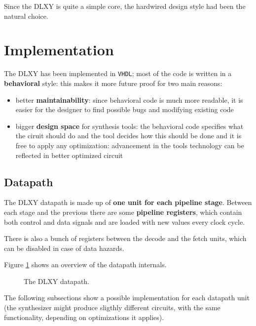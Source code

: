 \bigskip
Since the DLXY is quite a simple core, the hardwired design style had been the
natural choice.

\section{Implementation}
The DLXY has been implemented in \texttt{VHDL}; most of the code is written in a
\textbf{behavioral} style: this makes it more future proof for two main reasons:
\begin{itemize}
	\item better \textbf{maintainability}: since behavioral code is much
		more readable, it is easier for the designer to find possible
		bugs and modifying existing code
	\item bigger \textbf{design space} for synthesis tools: the behavioral
		code specifies what the ciruit should do and the tool decides
		how this should be done and it is free to apply any optimization:
		advancement in the tools technology can be reflected in better
		optimized circuit
\end{itemize}

\subsection{Datapath}
The DLXY datapath is made up of \textbf{one unit for each pipeline stage}.
Between each stage and the previous there are some \textbf{pipeline registers},
which contain both control and data signals and are loaded with new values every
clock cycle.

There is also a bunch of registers between the decode and the fetch units, which
can be disabled in case of data hazards.

\bigskip
Figure \ref{fig:datapath} shows an overview of the datapath internals.

\begin{figure}[H]
	\centering
	\caption{The DLXY datapath.}
	\label{fig:datapath}
\end{figure}

\bigskip
The following subsections show a possible implementation for each datapath unit
(the synthesizer might produce sligthly different circuits, with the same
functionality, depending on optimizations it applies).

